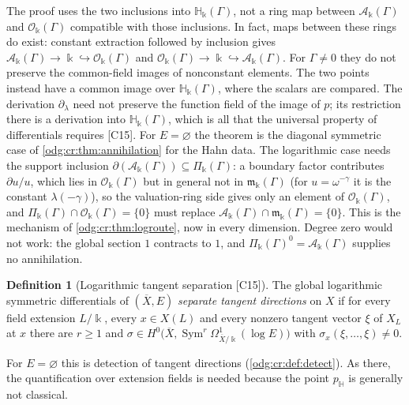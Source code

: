 \documentclass[11pt,oneside]{article}
\numberwithin{equation}{section}
\theoremstyle{definition}
\newtheorem{definition}[definition]{Definition}
\theoremstyle{remark}
\newcommand{\src}[1]{\textup{\textsf{\small[#1]}}}
\newcommand{\crH}{\mathbb H_\Bbbk(\Gamma)}
\newcommand{\crA}{\mathcal A_\Bbbk(\Gamma)}
\newcommand{\crP}{\Pi_\Bbbk(\Gamma)}
\newcommand{\crO}{\mathcal O_\Bbbk(\Gamma)}
\newcommand{\crm}{\mathfrak m_\Bbbk(\Gamma)}
\newcommand{\Sym}{\operatorname{Sym}}
\begin{document}
The proof uses the two inclusions into $\crH$, not a ring map between
$\crA$ and $\crO$ compatible with those inclusions. In fact, maps between
these rings do exist: constant extraction followed by inclusion gives
$\crA\to\Bbbk\hookrightarrow\crO$ and
$\crO\to\Bbbk\hookrightarrow\crA$. For $\Gamma\ne0$ they do not preserve
the common-field images of nonconstant elements. The two points instead
have a common image over $\crH$, where the scalars are compared. The derivation
$\partial_\lambda$ need not preserve the function field of the image of $p$; its
restriction there is a derivation into $\crH$, which is all that the universal property
of differentials requires \src{C15}. For $E=\varnothing$ the theorem is the diagonal
symmetric case of \cref{odg:cr:thm:annihilation} for the Hahn data. The logarithmic case
needs the support inclusion $\partial(\crA)\subseteq\crP$: a boundary factor contributes
$\partial u/u$, which lies in $\crO$ but in general not in $\crm$ (for $u=\omega^{-\gamma}$
it is the constant $\lambda(-\gamma)$), so the valuation-ring side gives only an element of
$\crO$, and $\crP\cap\crO=\{0\}$ must replace $\crA\cap\crm=\{0\}$. This is the mechanism
of \cref{odg:cr:thm:logroute}, now in every dimension.
Degree zero would not work: the global section $1$ contracts to $1$,
and $\crP^0=\crA$ supplies no annihilation.

\begin{definition}[Logarithmic tangent separation \src{C15}]\label{odg:log:def:separation}
The global logarithmic symmetric differentials of $(\overline X,E)$ \emph{separate
tangent directions} on $X$ if for every field extension $L/\Bbbk$, every $x\in X(L)$ and
every nonzero tangent vector $\xi$ of $X_L$ at $x$ there are $r\ge1$ and
$\sigma\in H^0\bigl(\overline X,\Sym^r\Omega^1_{\overline X/\Bbbk}(\log E)\bigr)$ with
$\sigma_x(\xi,\ldots,\xi)\ne0$.
\end{definition}

For $E=\varnothing$ this is detection of tangent directions (\cref{odg:cr:def:detect}).
As there, the quantification over extension fields is needed because the point
$p_{\mathbb H}$ is generally not classical.
\end{document}
